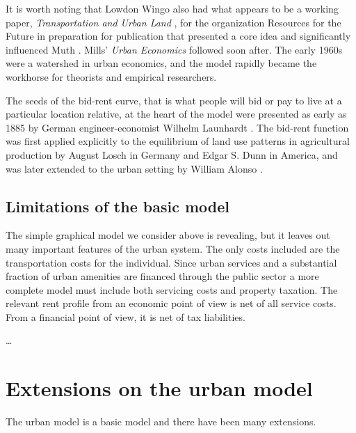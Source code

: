 It is worth noting that Lowdon Wingo also had what appears to be a working paper, \textit{Transportation and Urban Land} \cite{wingoTransportationUrbanLand1961}, for the organization Resources for the Future  in preparation for publication that presented a core idea and  significantly influenced Muth \cite{mcdonaldWilliamAlonsoRichard2007}. Mills' \textit{Urban Economics} \cite{millsUrbanEconomics1972} followed soon after. The early 1960s were a watershed in urban economics, and the model rapidly became the workhorse for theorists and empirical researchers.

The seeds of the \gls{bid-rent curve}, that is what people will bid or pay to live at a particular location relative, at the heart of the model were presented as early as 1885  by German engineer-economist Wilhelm Launhardt \cite{blaugEconomicTheoryRetrospect1985, launhardtMathematischeBegruendungVolkswirthschaftslehre1885}. The  \gls{bid-rent function} was first applied explicitly to the equilibrium of land use patterns in agricultural production by August Losch \cite{loschEconomicsLocation1954} in Germany and Edgar S. Dunn \cite{dunnEquilibriumLandUsePatterns1954} in America, and was later extended to the urban setting by William Alonso \cite{alonsoModelUrbanLand1960}. 
 
\subsection{Limitations of the basic model}
The simple graphical model we consider above is revealing, but it leaves out many important features of the urban system. The only costs included are the transportation costs for the individual.  Since urban services and  a substantial fraction of urban amenities are financed through the public sector a more complete model must include both servicing costs and property taxation. The relevant rent profile from an economic point of view is net of all service costs. From a financial point of view, it is net of tax liabilities.%

\dots

\section{Extensions on the urban model}

The urban model is a basic model and there have been many extensions. %

